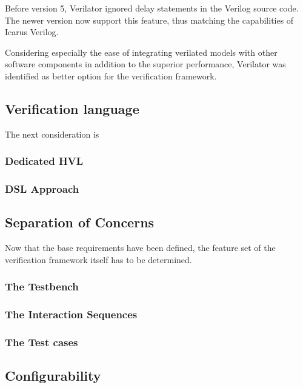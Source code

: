 \documentclass[12pt]{book}
\begin{document}
Before version 5, Verilator ignored delay statements in the Verilog source code. The newer version now support this feature, thus matching the capabilities of Icarus Verilog. 

Considering especially the ease of integrating verilated models with other software components in addition to the superior performance, Verilator was identified as better option for the verification framework.


\subsection{Verification language}
The next consideration is 

\subsubsection{Dedicated HVL}

\subsubsection{DSL Approach}

\subsection{Separation of Concerns} %
Now that the base requirements have been defined, the feature set of the verification framework itself has to be determined. 

\subsubsection{The Testbench}

\subsubsection{The Interaction Sequences}

\subsubsection{The Test cases}

\subsection{Configurability} %
\end{document}

